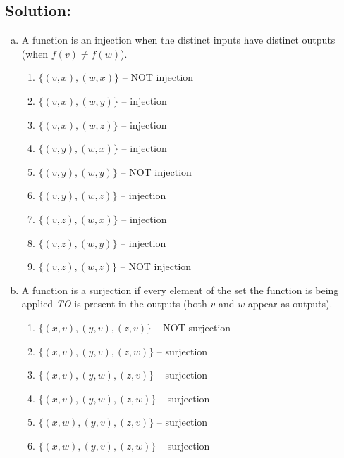 \documentclass[12pt]{article}
\begin{document}
	\subsection*{\textbf{Solution:}}
	\begin{enumerate}[(a)]
		\item A function is an injection when the distinct inputs have distinct outputs
			(when $f(v)\not= f(w)$).
			\begin{enumerate}[1.]
				\item $\{(v,x),(w,x)\}$ -- NOT injection

				\item $\{(v,x),(w,y)\}$ -- injection

				\item $\{(v,x),(w,z)\}$ -- injection

				\item $\{(v,y),(w,x)\}$ -- injection

				\item $\{(v,y),(w,y)\}$ -- NOT injection

				\item $\{(v,y),(w,z)\}$ -- injection

				\item $\{(v,z),(w,x)\}$ -- injection

				\item $\{(v,z),(w,y)\}$ -- injection

				\item $\{(v,z),(w,z)\}$ -- NOT injection
			\end{enumerate}

		\item A function is a surjection if every element of the set the function is
			being applied \textit{TO} is present in the outputs (both $v$ and $w$ appear
			as outputs).
			\begin{enumerate}[1.]
				\item $\{(x,v),(y,v),(z,v)\}$ -- NOT surjection

				\item $\{(x,v),(y,v),(z,w)\}$ -- surjection

				\item $\{(x,v),(y,w),(z,v)\}$ -- surjection

				\item $\{(x,v),(y,w),(z,w)\}$ -- surjection

				\item $\{(x,w),(y,v),(z,v)\}$ -- surjection

				\item $\{(x,w),(y,v),(z,w)\}$ -- surjection


\end{enumerate}
\end{enumerate}
\end{document}
